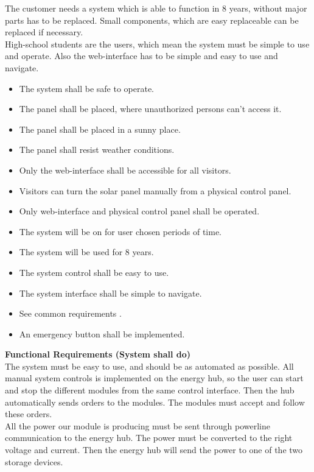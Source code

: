 \documentclass[12pt,a4paper]{report}
\begin{document}
The customer needs a system which is able to function in 8 years, without major parts has to be replaced. Small components, which are easy replaceable can be replaced if necessary.\\

High-school students are the users, which mean the system must be simple to use and operate. Also the web-interface has to be simple and easy to use and navigate.

\begin{itemize}
\item The system shall be safe to operate.
\item The panel shall be placed, where unauthorized persons can’t access it.
\item The panel shall be placed in a sunny place.
\item The panel shall resist weather conditions.
\item Only the web-interface shall be accessible for all visitors.
\item Visitors can turn the solar panel manually from a physical control panel.
\item Only web-interface and physical control panel shall be operated. 
\item The system will be on for user chosen periods of time.
\item The system will be used for 8 years.
\item The system control shall be easy to use.
\item The system interface shall be simple to navigate.
\item See common requirements .
\item An emergency button shall be implemented.
\end{itemize}

\textbf{Functional Requirements (System shall do)}\\

The system must be easy to use, and should be as automated as possible. All manual system controls is implemented on the energy hub, so the user can start and stop the different modules from the same control interface. Then the hub automatically sends orders to the modules. The modules must accept and follow these orders.\\

All the power our module is producing must be sent through powerline communication to the energy hub. The power must be converted to the right voltage and current. Then the energy hub will send the power to one of the two storage devices.\\
\end{document}
